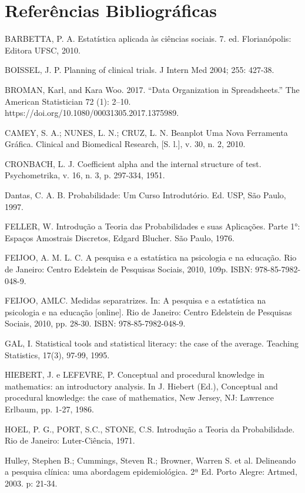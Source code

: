 \chapter{Referências Bibliográficas}

BARBETTA, P. A. Estatística aplicada às ciências sociais. 7. ed. Florianópolis: Editora UFSC, 2010.\vskip0.3cm

BOISSEL, J. P. Planning of clinical trials. J Intern Med 2004; 255: 427-38.\vskip0.3cm

BROMAN, Karl, and Kara Woo. 2017. “Data Organization in Spreadsheets.” The American Statistician 72 (1): 2–10. https://doi.org/10.1080/00031305.2017.1375989.\vskip0.3cm

CAMEY, S. A.; NUNES, L. N.; CRUZ, L. N. Beanplot Uma Nova Ferramenta Gráfica. Clinical and Biomedical Research, [S. l.], v. 30, n. 2, 2010.\vskip0.3cm


CRONBACH, L. J. Coefficient alpha and the internal structure of test. Psychometrika, v. 16, n. 3, p. 297-334, 1951.\vskip0.3cm

Dantas, C. A. B. Probabilidade: Um Curso Introdutório. Ed.
USP, São Paulo, 1997.

FELLER, W. Introdução a Teoria das Probabilidades e suas
Aplicações. Parte 1°: Espaços Amostrais Discretos, Edgard Blucher. São Paulo, 1976.\vskip0.3cm

FEIJOO, A. M. L. C. A pesquisa e a estatística na psicologia e na educação. Rio de Janeiro:
Centro Edelstein de Pesquisas Sociais, 2010, 109p. ISBN: 978-85-7982-048-9.\vskip0.3cm


FEIJOO, AMLC. Medidas separatrizes. In: A pesquisa e a estatística na psicologia e na educação
[online]. Rio de Janeiro: Centro Edelstein de Pesquisas Sociais, 2010, pp. 28-30. ISBN: 978-85-7982-048-9.\vskip0.3cm



GAL, I. Statistical tools and statistical literacy: the case of the average. Teaching
Statistics, 17(3), 97-99, 1995.\vskip0.3cm

HIEBERT, J. e LEFEVRE, P. Conceptual and procedural knowledge in mathematics: an
introductory analysis. In J. Hiebert (Ed.), Conceptual and procedural knowledge: the
case of mathematics, New Jersey, NJ: Lawrence Erlbaum, pp. 1-27, 1986.\vskip0.3cm

HOEL, P. G., PORT, S.C., STONE, C.S. Introdução a Teoria da Probabilidade. Rio de
Janeiro: Luter-Ciência, 1971.\vskip0.3cm

Hulley, Stephen B.; Cummings, Steven R.; Browner, Warren S. et al. Delineando a pesquisa clínica: uma abordagem epidemiológica. 2ª Ed. Porto Alegre: Artmed, 2003. p: 21-34.\vskip0.3cm

